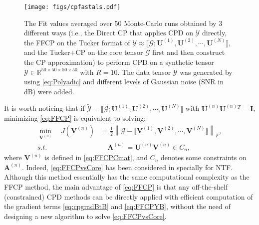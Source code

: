 \documentclass[10pt,twocolumn,twoside]{IEEEtran}
\newcommand{\mat}[1]{\ensuremath{\mathbf{#1}}}
\newcommand{\matI}{\mat{I}}
\newcommand{\tensor}[1]{\ensuremath{\boldsymbol{\mathscr{#1}}}}
\newcommand{\matn}[2][n]{\ensuremath{\mathbf{#2}^{(#1)}}}
\newcommand{\compactTucker}[2]{\ensuremath{\llbracket \tensor{#1}; {\mathbf{#2}}^{(1)}, {\mathbf{#2}}^{(2)}, \cdots, {\mathbf{#2}}^{(N)}\rrbracket}}
\newcommand{\compactcp}[1]{\ensuremath{\llbracket {\mathbf{#1}}^{(1)}, {\mathbf{#1}}^{(2)}, \cdots, {\mathbf{#1}}^{(N)}\rrbracket}}
\newcommand{\Real}{\ensuremath{\mathbb{R}}}
\newcommand{\frob}[2][F]{\ensuremath{\left\|#2\right\|_{#1}}}
\begin{document}
 \begin{figure}[!t]
\centerline{
    \texttt{[image: figs/cpfastals.pdf]}
}
\caption{The Fit values averaged over 50 Monte-Carlo runs obtained by 3 different ways (i.e., the Direct CP that applies CPD on \tensor{Y} directly, the FFCP on the Tucker format of $\tensor{Y}\approx\compactTucker{G}{U}$, and the Tucker+CP on the core tensor \tensor{G} first and then construct the CP approximation) to perform CPD on a synthetic tensor $\tensor{Y}\in\Real^{50\times50\times50\times50}$ with $R=10$. The data tensor \tensor{Y} was generated by using \eqref{eq:Polyadic} and different levels of Gaussian noise (SNR in dB) were added.}
\label{fig:3Ways}
\end{figure}


It is worth noticing that if $\tensor{\tilde{Y}}=\compactTucker{G}{U}$ with $\matn{U}\matn{U}{}^T=\matI$,  minimizing \eqref{eq:FFCP} is equivalent to solving:
\begin{equation}
\label{eq:FFCPvsCore}
\begin{split}
\min_{\matn{V}} \quad J(\matn{V})  & = \frac{1}{2} \frob{\tensor{G}-\compactcp{V}},\\
s.t. & \quad \matn{A}=\matn{U}\matn{V}\in C_n,
\end{split}
\end{equation}
where  \matn{V} is defined in \eqref{eq:FFCPCmat}, and $C_n$ denotes some constraints on \matn{A}. Indeed, \eqref{eq:FFCPvsCore} has been considered in \cite{ComonNTF}  specially for NTF. Although this method essentially has the same computational complexity as the FFCP method,  the main advantage of \eqref{eq:FFCP} is that any off-the-shelf (constrained) CPD methods can be directly applied with efficient computation of the gradient terms \eqref{eq:cpgradBtB} and \eqref{eq:FFCPYB},  without the need of designing a new algorithm to solve \eqref{eq:FFCPvsCore}.
\end{document}
